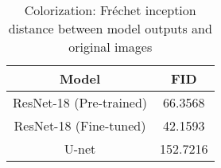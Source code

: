 \begin{table}[!htb]
\centering
\setlength{\tabcolsep}{4pt} %
\renewcommand{\arraystretch}{1.5} %
\begin{tabular}{c | c }
        \hline
        \textbf{Model} & \textbf{FID}\\
        \hline
        ResNet-18 (Pre-trained) & 66.3568\\
        ResNet-18 (Fine-tuned) & 42.1593\\
        U-net & 152.7216\\
        \hline
    \end{tabular}
\caption{Colorization: Fréchet inception distance between model outputs and original images}
\label{tab:colorization_FID}
\end{table}